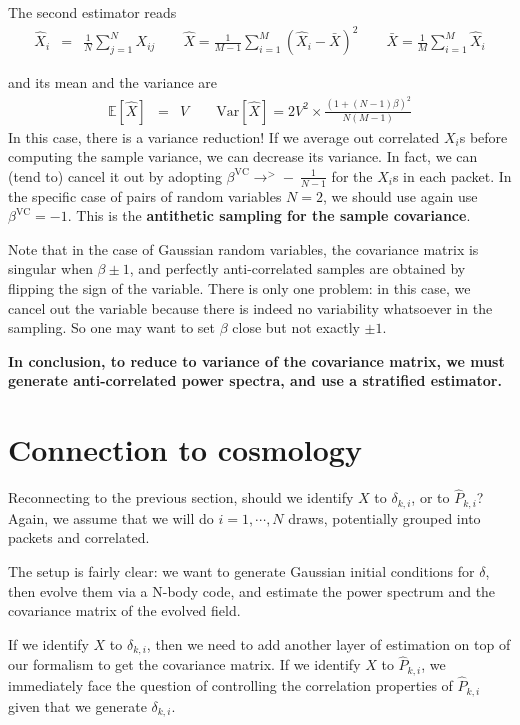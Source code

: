 \documentclass{aastex6}
\newcommand{\eqn}[1]{\begin{eqnarray}#1\end{eqnarray}}
\begin{document}
The second estimator reads
\eqn{
	\hat{X}_i &=& \frac{1}{N}\sum_{j=1}^N X_{ij}	\quad\quad
	\hat{X} =  \frac{1}{M-1}\sum_{i=1}^M (\hat{X}_i  - \bar{X})^2 \quad\quad
	\bar{X} =  \frac{1}{M}\sum_{i=1}^M \hat{X}_i
}

and its mean and the variance are
\eqn{
	\mathbb{E}[\hat{X}] &=& V \quad\quad
	 \mathrm{Var}[\hat{X}] = 2V^2 \times \frac{(1 + (N-1)\beta)^2}{N (M-1)}
}
In this case, there is a variance reduction! If we average out correlated $X_i$s before computing the sample variance, we can decrease its variance. In fact, we can (tend to) cancel it out by adopting $\beta^\mathrm{VC} \rightarrow^{>} - \ \frac{1}{N-1}$ for the $X_i$s in each packet. In the specific case of pairs of random variables $N=2$, we should use again use $\beta^\mathrm{VC} = -1$. This is the \textbf{antithetic sampling for the sample covariance}.

Note that in the case of Gaussian random variables, the covariance matrix is singular when $\beta \pm 1$, and perfectly anti-correlated samples are obtained by flipping the sign of the variable. There is only one problem: in this case, we cancel out the variable because there is indeed no variability whatsoever in the sampling. So one may  want to set $\beta$ close but not exactly $\pm1$.

\textbf{In conclusion, to reduce to variance of the covariance matrix, we must generate anti-correlated power spectra, and use a stratified estimator.}

\section{Connection to cosmology}

Reconnecting to the previous section, should we identify $X$ to $\delta_{k, i}$, or to $\hat{P}_{k,i}$? Again, we assume that we will do $i=1, \cdots, N$ draws, potentially grouped into packets and correlated.

The setup is fairly clear: we want to generate Gaussian initial conditions for $\delta$, then evolve them via a N-body code, and estimate the power spectrum and the covariance matrix of the evolved field. 

If we identify $X$ to $\delta_{k, i}$, then we need to add another layer of estimation on top of our formalism to get the covariance matrix. 
If we identify $X$ to $\hat{P}_{k,i}$, we immediately face the question of controlling the correlation properties of $\hat{P}_{k,i}$ given that we generate $\delta_{k, i}$.
\end{document}
